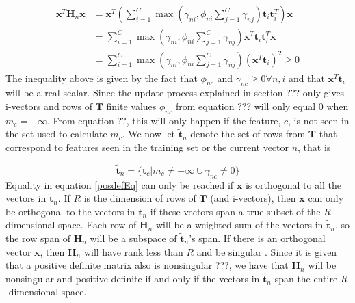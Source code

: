 \begin{align}
\mathbf{x}^T\mathbf{H}_n\mathbf{x} &= \mathbf{x}^T\left(\sum_{i=1}^C\max(\gamma_{ni}, \phi_{ni}\sum_{j=1}^{C}\gamma_{nj})\mathbf{t}_i\mathbf{t}_i^T\right)\mathbf{x} \nonumber \\
&= \sum_{i=1}^C\max(\gamma_{ni}, \phi_{ni}\sum_{j=1}^{C}\gamma_{nj})\mathbf{x}^T\mathbf{t}_i\mathbf{t}_i^T\mathbf{x} \label{posdefEq}\\
&= \sum_{i=1}^C\max(\gamma_{ni}, \phi_{ni}\sum_{j=1}^{C}\gamma_{nj})(\mathbf{x}^T\mathbf{t}_i)^2 \geq 0 \nonumber
\end{align}
The inequality above is given by the fact that $\phi_{nc}$ and $\gamma_{nc} \geq 0 \forall n, i$ and that $\mathbf{x}^T\mathbf{t}_c$ will be a real scalar. Since the update process explained in section ??? only gives i-vectors and rows of $\mathbf{T}$ finite values $\phi_{nc}$ from equation ??? will only equal 0 when $m_c = -\infty$. From equation ??, this will only happen if the feature, $c$, is not seen in the set used to calculate $m_c$. We now let $\mathbf{\tilde{t}}_n$ denote the set of rows from $\mathbf{T}$ that correspond to features seen in the training set or the current vector $n$, that is

\begin{equation*}
\mathbf{\tilde{t}}_n = \{\mathbf{t}_c | m_c \neq -\infty \cup \gamma_{nc} \neq 0\}
\end{equation*}
Equality in equation \ref{posdefEq} can only be reached if $\mathbf{x}$ is orthogonal to all the vectors in $\mathbf{\tilde{t}}_n$. If $R$ is the dimension of rows of $\mathbf{T}$ (and i-vectors), then $\mathbf{x}$ can only be orthogonal to the vectors in $\mathbf{\tilde{t}}_n$ if these vectors span a true subset of the $R$-dimensional space. Each row of $\mathbf{H}_n$ will be a weighted sum of the vectors in $\mathbf{\tilde{t}}_n$, so the row span of $\mathbf{H}_n$ will be a subspace of $\mathbf{\tilde{t}}_n$'s span. If there is an orthogonal vector $\mathbf{x}$, then $\mathbf{H}_n$ will have rank less than $R$ and be singular \cite[p. 54]{matte3}. Since it is given that a positive definite matrix also is nonsingular ???,  we have that $\mathbf{H}_n$ will be nonsingular and positive definite if and only if the vectors in $\mathbf{\tilde{t}}_n$ span the entire $R$-dimensional space.


